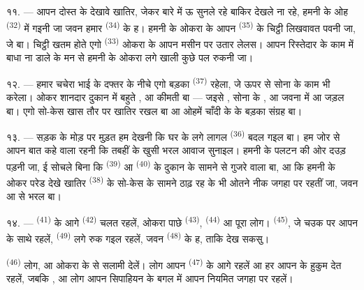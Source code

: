 \VUsaut{3.0mm}

११. --- आपन दोस्त के  देखावे खातिर, जेकर बारे में ऊ
सुनले रहे बाकिर देखले ना रहे, हमनी के ओह  \textsuperscript{(32)} में
गइनी जा जवन हमार  \textsuperscript{(34)} के ह।
हमनी के ओकरा के आपन  \textsuperscript{(35)} के चिट्ठी लिखवावत
पवनी जा, जे  बा। चिट्ठी खतम होते एगो 
\textsuperscript{(33)} ओकरा के आपन मसीन पर उतार लेलस। आपन रिस्तेदार के काम
में बाधा ना डाले के मन से हमनी के ओकरा लगे खाली कुछे पल रुकनी जा।

१२. --- हमार चचेरा भाई के दफ्तर के नीचे एगो बड़का 
\textsuperscript{(37)} रहेला, जे ऊपर से सोना के काम भी करेला। ओकर शानदार
दुकान में बहुते ,  आ
कीमती  बा — जइसे , सोना के
,  आ  जवना में  आ
 जड़ल बा। एगो सो-केस खास तौर पर 
खातिर रखल बा आ ओहमें चाँदी के  के बड़का संग्रह बा।

१३. --- सड़क के मोड़ पर मुड़त हम देखनी कि घर के  लगे लागल
 \textsuperscript{(36)} बदल गइल बा। हम जोर से आपन बात कहे
वाला रहनी कि तबहीं  के खुसी भरल आवाज सुनाइल। हमनी के
पलटन की ओर दउड़ पड़नी जा, ई सोचले बिना कि  
\textsuperscript{(39)} आ  \textsuperscript{(40)} के दुकान
के सामने से गुजरे वाला बा, आ कि हमनी के ओकर परेड देखे खातिर
 \textsuperscript{(38)} के सो-केस के सामने ठाढ़ रह के
भी ओतने नीक जगहा पर रहतीं जा, जवन  आ
 से भरल बा।

\VUsaut{3.0mm}

१४. ---  \textsuperscript{(41)} के आगे 
\textsuperscript{(42)} चलत रहलें, ओकरा पाछे 
\textsuperscript{(43)},  \textsuperscript{(44)} आ पूरा
 लोग।  \textsuperscript{(45)}, जे चउक पर आपन
 के साथे रहलें, 
\textsuperscript{(49)} लगे रुक गइल रहलें, जवन 
\textsuperscript{(48)} के ह, ताकि  देख सकसु।

 \textsuperscript{(46)} लोग,  आ
 ओकरा के  से सलामी देलें।
 लोग आपन  \textsuperscript{(47)} के आगे रहलें आ
हर  आपन  के हुकुम देत रहलें, जबकि
,  आ  लोग आपन
सिपाहियन के बगल में आपन नियमित जगहा पर रहलें।

